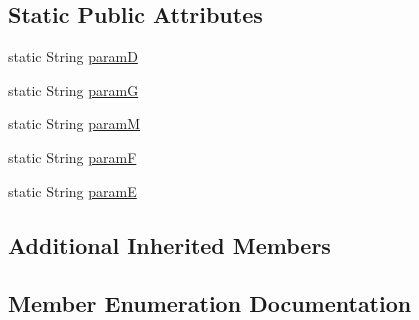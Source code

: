 \subsection*{Static Public Attributes}
\begin{DoxyCompactItemize}
\item 
static String \hyperlink{class_audealize_1_1_audealizereverb_audio_processor_a5075b2df5f4540e479d2dddc6f5178a9}{paramD}
\item 
static String \hyperlink{class_audealize_1_1_audealizereverb_audio_processor_a2a3fc9c4b12a08e68aa8457cae9ce3ff}{paramG}
\item 
static String \hyperlink{class_audealize_1_1_audealizereverb_audio_processor_a3e3ec2690abdac5cbca63fccd0f0d362}{paramM}
\item 
static String \hyperlink{class_audealize_1_1_audealizereverb_audio_processor_a44f3dca41c6e7237c5c1898b1048c1c4}{paramF}
\item 
static String \hyperlink{class_audealize_1_1_audealizereverb_audio_processor_a9aba74977dd6a007c7c0bee781204750}{paramE}
\end{DoxyCompactItemize}
\subsection*{Additional Inherited Members}


\subsection{Member Enumeration Documentation}
